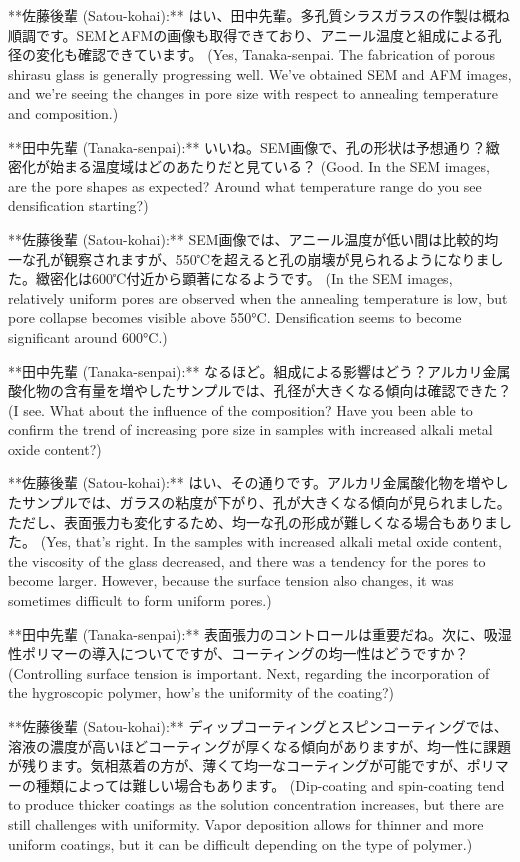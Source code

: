 \documentclass{article}
\begin{document}
**佐藤後輩 (Satou-kohai):** はい、田中先輩。多孔質シラスガラスの作製は概ね順調です。SEMとAFMの画像も取得できており、アニール温度と組成による孔径の変化も確認できています。 (Yes, Tanaka-senpai. The fabrication of porous shirasu glass is generally progressing well. We've obtained SEM and AFM images, and we're seeing the changes in pore size with respect to annealing temperature and composition.)

**田中先輩 (Tanaka-senpai):** いいね。SEM画像で、孔の形状は予想通り？緻密化が始まる温度域はどのあたりだと見ている？ (Good. In the SEM images, are the pore shapes as expected? Around what temperature range do you see densification starting?)

**佐藤後輩 (Satou-kohai):** SEM画像では、アニール温度が低い間は比較的均一な孔が観察されますが、550℃を超えると孔の崩壊が見られるようになりました。緻密化は600℃付近から顕著になるようです。 (In the SEM images, relatively uniform pores are observed when the annealing temperature is low, but pore collapse becomes visible above 550°C. Densification seems to become significant around 600°C.)

**田中先輩 (Tanaka-senpai):** なるほど。組成による影響はどう？アルカリ金属酸化物の含有量を増やしたサンプルでは、孔径が大きくなる傾向は確認できた？ (I see. What about the influence of the composition? Have you been able to confirm the trend of increasing pore size in samples with increased alkali metal oxide content?)

**佐藤後輩 (Satou-kohai):** はい、その通りです。アルカリ金属酸化物を増やしたサンプルでは、ガラスの粘度が下がり、孔が大きくなる傾向が見られました。ただし、表面張力も変化するため、均一な孔の形成が難しくなる場合もありました。 (Yes, that's right. In the samples with increased alkali metal oxide content, the viscosity of the glass decreased, and there was a tendency for the pores to become larger. However, because the surface tension also changes, it was sometimes difficult to form uniform pores.)

**田中先輩 (Tanaka-senpai):** 表面張力のコントロールは重要だね。次に、吸湿性ポリマーの導入についてですが、コーティングの均一性はどうですか？ (Controlling surface tension is important. Next, regarding the incorporation of the hygroscopic polymer, how's the uniformity of the coating?)

**佐藤後輩 (Satou-kohai):** ディップコーティングとスピンコーティングでは、溶液の濃度が高いほどコーティングが厚くなる傾向がありますが、均一性に課題が残ります。気相蒸着の方が、薄くて均一なコーティングが可能ですが、ポリマーの種類によっては難しい場合もあります。 (Dip-coating and spin-coating tend to produce thicker coatings as the solution concentration increases, but there are still challenges with uniformity. Vapor deposition allows for thinner and more uniform coatings, but it can be difficult depending on the type of polymer.)
\end{document}
